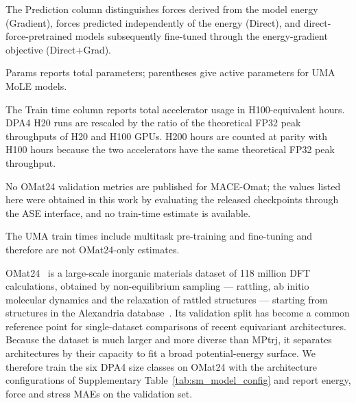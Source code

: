 \begin{table}[t]
\begin{threeparttable}
\begin{tablenotes}[flushleft]
            \item[a] The Prediction column distinguishes forces derived from the model energy (Gradient), forces predicted independently of the energy (Direct), and direct-force-pretrained models subsequently fine-tuned through the energy-gradient objective (Direct+Grad).
            \item[b] Params reports total parameters; parentheses give active parameters for UMA MoLE models.
            \item[c] The Train time column reports total accelerator usage in H100-equivalent hours.
            DPA4 H20 runs are rescaled by the ratio of the theoretical FP32 peak throughputs of H20 and H100 GPUs.
            H200 hours are counted at parity with H100 hours because the two accelerators have the same theoretical FP32 peak throughput.
            \item[d] No OMat24 validation metrics are published for MACE-Omat; the values listed here were obtained in this work by evaluating the released checkpoints through the ASE interface, and no train-time estimate is available.
            \item[e] The UMA train times include multitask pre-training and fine-tuning and therefore are not OMat24-only estimates.
        \end{tablenotes}
    \end{threeparttable}
\end{table}

OMat24~\cite{barroso2024open} is a large-scale inorganic materials dataset of 118 million DFT calculations, obtained by non-equilibrium sampling --- rattling, ab initio molecular dynamics and the relaxation of rattled structures --- starting from structures in the Alexandria database~\cite{schmidt2023alexandria}.
Its validation split has become a common reference point for single-dataset comparisons of recent equivariant architectures.
Because the dataset is much larger and more diverse than MPtrj, it separates architectures by their capacity to fit a broad potential-energy surface.
We therefore train the six DPA4 size classes on OMat24 with the architecture configurations of Supplementary Table~\ref{tab:sm_model_config} and report energy, force and stress MAEs on the validation set.

